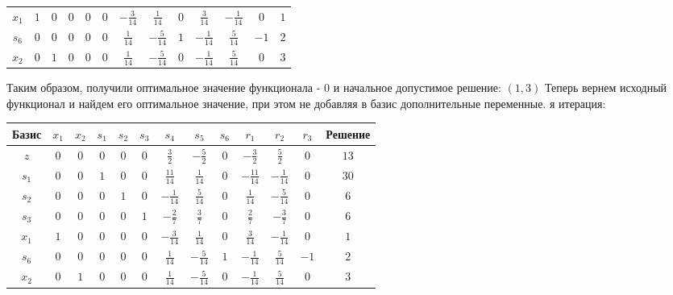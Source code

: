 \documentclass{article}%
\begin{document}
\begin{flushleft}
\begin{tabular}{|c|ccccccccccc|c|}
$x_{1}$&$1$&$0$&$0$&$0$&$0$&$-\frac{3}{14}$&$\frac{1}{14}$&$0$&$\frac{3}{14}$&$-\frac{1}{14}$&$0$&$1$\\%
$s_{6}$&$0$&$0$&$0$&$0$&$0$&$\frac{1}{14}$&$-\frac{5}{14}$&$1$&$-\frac{1}{14}$&$\frac{5}{14}$&$-1$&$2$\\%
$x_{2}$&$0$&$1$&$0$&$0$&$0$&$\frac{1}{14}$&$-\frac{5}{14}$&$0$&$-\frac{1}{14}$&$\frac{5}{14}$&$0$&$3$\\%
\hline%
\end{tabular}%
\newline%
\newline%
Таким образом, получили оптимальное значение функционала {-} 0 и начальное допустимое решение: %
$(1, 3)$%
\newline%
Теперь вернем исходный функционал и найдем его оптимальное значение, при этом не добавляя в базис дополнительные переменные.%
я итерация: %
\newline%
\newline%
\renewcommand{\arraystretch}{1.3}%
\begin{tabular}{|c|ccccccccccc|c|}%
\hline%
Базис&$x_{1}$&$x_{2}$&$s_{1}$&$s_{2}$&$s_{3}$&$s_{4}$&$s_{5}$&$s_{6}$&$r_{1}$&$r_{2}$&$r_{3}$&Решение\\%
\hline%
$z$&$0$&$0$&$0$&$0$&$0$&$\frac{3}{2}$&$-\frac{5}{2}$&$0$&$-\frac{3}{2}$&$\frac{5}{2}$&$0$&$13$\\%
\hline%
$s_{1}$&$0$&$0$&$1$&$0$&$0$&$\frac{11}{14}$&$\frac{1}{14}$&$0$&$-\frac{11}{14}$&$-\frac{1}{14}$&$0$&$30$\\%
$s_{2}$&$0$&$0$&$0$&$1$&$0$&$-\frac{1}{14}$&$\frac{5}{14}$&$0$&$\frac{1}{14}$&$-\frac{5}{14}$&$0$&$6$\\%
$s_{3}$&$0$&$0$&$0$&$0$&$1$&$-\frac{2}{7}$&$\frac{3}{7}$&$0$&$\frac{2}{7}$&$-\frac{3}{7}$&$0$&$6$\\%
$x_{1}$&$1$&$0$&$0$&$0$&$0$&$-\frac{3}{14}$&$\frac{1}{14}$&$0$&$\frac{3}{14}$&$-\frac{1}{14}$&$0$&$1$\\%
$s_{6}$&$0$&$0$&$0$&$0$&$0$&$\frac{1}{14}$&$-\frac{5}{14}$&$1$&$-\frac{1}{14}$&$\frac{5}{14}$&$-1$&$2$\\%
$x_{2}$&$0$&$1$&$0$&$0$&$0$&$\frac{1}{14}$&$-\frac{5}{14}$&$0$&$-\frac{1}{14}$&$\frac{5}{14}$&$0$&$3$\\%
\hline%
\end{tabular}%
\newline%
\newline%
\newline%
\begin{tabular}{|cccc|}%

\end{tabular}
\end{flushleft}
\end{document}
